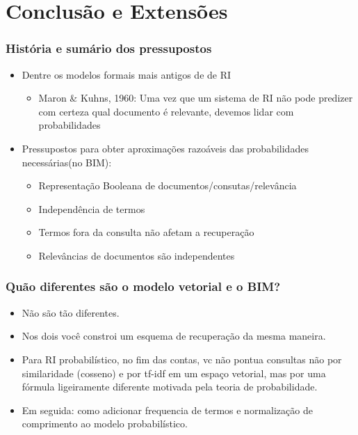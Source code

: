 \documentclass[compress]{beamer}
\begin{document}
\section{Conclusão e Extensões}
\begin{frame}[<+->]
\frametitle{História e sumário dos pressupostos}
\pause[2]

\begin{itemize}
\item Dentre os modelos formais mais antigos de de RI
\begin{itemize}
\item Maron \& Kuhns, 1960: Uma vez que um sistema de RI não pode predizer com certeza  qual documento é relevante, devemos lidar com probabilidades
\end{itemize}

\item Pressupostos para obter aproximações razoáveis das probabilidades necessárias(no BIM):
\begin{itemize}

\item Representação Booleana de documentos/consutas/relevância

\item Independência de termos

\item Termos fora da consulta não afetam a recuperação

\item Relevâncias de documentos são independentes
\end{itemize}
\end{itemize} 
\end{frame}

\begin{frame}[<+->]
\frametitle{Quão diferentes são o modelo vetorial e o BIM?}
\pause[2]

\begin{itemize} 
\item Não são tão diferentes.
\item Nos dois você constroi um esquema de recuperação da mesma maneira.  
\item Para RI probabilístico, no fim das contas, vc não pontua consultas não por similaridade (cosseno) e por tf-idf em um espaço vetorial, mas por uma fórmula ligeiramente diferente motivada pela teoria de probabilidade.
\item Em seguida: como adicionar frequencia de termos e normalização de comprimento ao modelo probabilístico.
\end{itemize}
\end{frame}
\end{document}
